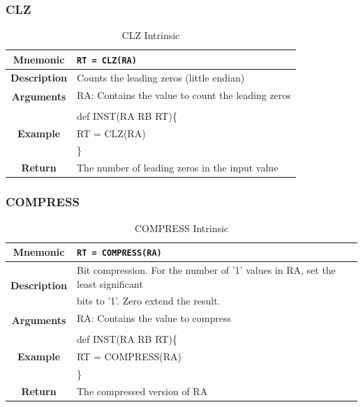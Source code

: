 \documentclass{article}
\begin{document}
\clearpage
\subsubsection{CLZ}
\label{sec:CLZ}

\begin{table}[h]
\begin{center}
\caption{CLZ Intrinsic}
\vspace{0.125in}
\label{tab:CLZIntrinsic}
\begin{tabular}{|c|l|}
\hline
\textbf{Mnemonic} & \texttt{RT = CLZ(RA)}\\
\hline
\textbf{Description} & Counts the leading zeros (little endian)\\
\hline
\multirow{2}{*}{\textbf{Arguments}} & RA: Contains the value to count the leading zeros\\
                          			     & \\
\hline
\multirow{3}{*}{\textbf{Example}} & def INST(RA RB RT)\{\\
                          			  &   RT = CLZ(RA)\\
                                                    & \}\\
\hline
\textbf{Return} & The number of leading zeros in the input value\\                                                    
\hline
\end{tabular}
\end{center}
\end{table}

\clearpage
\subsubsection{COMPRESS}
\label{sec:COMPRESS}

\begin{table}[h]
\begin{center}
\caption{COMPRESS Intrinsic}
\vspace{0.125in}
\label{tab:COMPRESSIntrinsic}
\begin{tabular}{|c|l|}
\hline
\textbf{Mnemonic} & \texttt{RT = COMPRESS(RA)}\\
\hline
\multirow{2}{*}{\textbf{Description}} & Bit compression.  For the number of '1' values in RA, set the least significant \\
						      & bits to '1'.  Zero extend the result.\\
\hline
\multirow{2}{*}{\textbf{Arguments}} & RA: Contains the value to compress\\
                          			     & \\
\hline
\multirow{3}{*}{\textbf{Example}} & def INST(RA RB RT)\{\\
                          			  &   RT = COMPRESS(RA)\\
                                                    & \}\\
\hline
\textbf{Return} & The compressed version of RA\\                                                    
\hline
\end{tabular}
\end{center}
\end{table}
\end{document}
